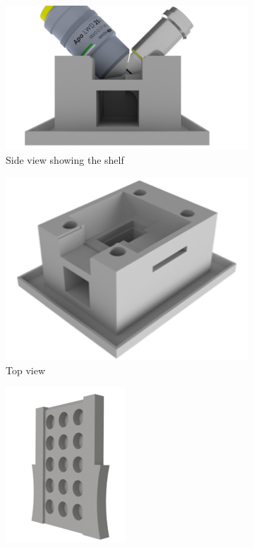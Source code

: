 \begin{figure}
    \centering
    \begin{subfigure}[b]{\linewidth}
         \centering
        \includegraphics{./chamber_side}
         \caption{Side view showing the shelf}\label{fig:chamber_side}
    \end{subfigure}
    \begin{subfigure}[b]{0.4\linewidth}
             \centering
        \includegraphics{./chamber_top}
         \caption{Top view}\label{fig:chamber_top}
    \end{subfigure}
    \begin{subfigure}[b]{0.4\linewidth}
             \centering
        \includegraphics{./chamber_slide}

\end{subfigure}
\end{figure}
